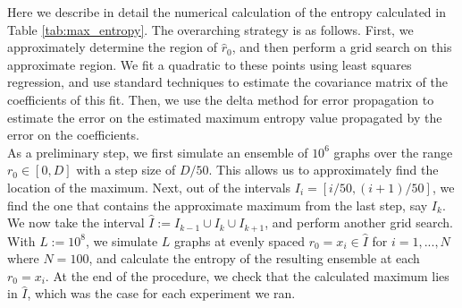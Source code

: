 \documentclass{article}
\begin{document}
Here we describe in detail the numerical calculation of the entropy calculated in Table \ref{tab:max_entropy}. The overarching strategy is as follows. First, we approximately determine the region of $\hat{r}_0$, and then perform a grid search on this approximate region. We fit a quadratic to these points using least squares regression, and use standard techniques to estimate the covariance matrix of the coefficients of this fit. Then, we use the delta method for error propagation to estimate the error on the estimated maximum entropy value propagated by the error on the coefficients. \\

As a preliminary step, we first simulate an ensemble of $10^6$ graphs over the range $r_0 \in [0,D]$ with a step size of $D/50$. This allows us to approximately find the location of the maximum. Next, out of the intervals $I_i = [i/50, (i+1)/50]$, we find the one that contains the approximate maximum from the last step, say $I_{k}$.\\

We now take the interval $\hat{I} := I_{k-1} \cup I_k \cup I_{k+1}$, and perform another grid search. With $L := 10^8$, we simulate $L$ graphs at evenly spaced $r_0 = x_i \in \hat{I}$ for $i=1,...,N$ where $N=100$, and calculate the entropy of the resulting ensemble at each $r_0 = x_i$. At the end of the procedure, we check that the calculated maximum lies in $\hat{I}$, which was the case for each experiment we ran. \\
\end{document}
